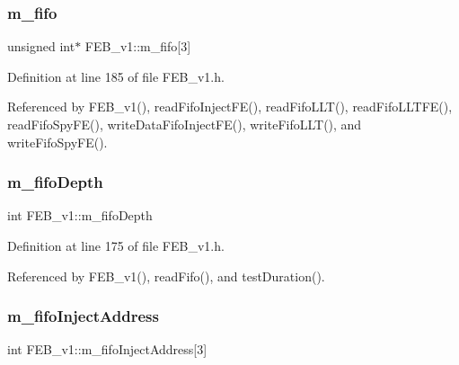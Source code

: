 \mbox{\label{classFEB__v1_ae5b770f2f5ffb97324862c93e3153985}} 
\subsubsection{\texorpdfstring{m\+\_\+fifo}{m\_fifo}}
{\footnotesize\ttfamily unsigned int$\ast$ F\+E\+B\+\_\+v1\+::m\+\_\+fifo\mbox{[}3\mbox{]}\hspace{0.3cm}{\ttfamily [private]}}



Definition at line 185 of file F\+E\+B\+\_\+v1.\+h.



Referenced by F\+E\+B\+\_\+v1(), read\+Fifo\+Inject\+F\+E(), read\+Fifo\+L\+L\+T(), read\+Fifo\+L\+L\+T\+F\+E(), read\+Fifo\+Spy\+F\+E(), write\+Data\+Fifo\+Inject\+F\+E(), write\+Fifo\+L\+L\+T(), and write\+Fifo\+Spy\+F\+E().

\mbox{\label{classFEB__v1_a30473bcdd8f018ad5dac728f6779df9c}} 
\subsubsection{\texorpdfstring{m\+\_\+fifo\+Depth}{m\_fifoDepth}}
{\footnotesize\ttfamily int F\+E\+B\+\_\+v1\+::m\+\_\+fifo\+Depth\hspace{0.3cm}{\ttfamily [private]}}



Definition at line 175 of file F\+E\+B\+\_\+v1.\+h.



Referenced by F\+E\+B\+\_\+v1(), read\+Fifo(), and test\+Duration().

\mbox{\label{classFEB__v1_afd035f292061e1823ed64471bb0228ef}} 
\subsubsection{\texorpdfstring{m\+\_\+fifo\+Inject\+Address}{m\_fifoInjectAddress}}
{\footnotesize\ttfamily int F\+E\+B\+\_\+v1\+::m\+\_\+fifo\+Inject\+Address\mbox{[}3\mbox{]}\hspace{0.3cm}{\ttfamily [private]}}



